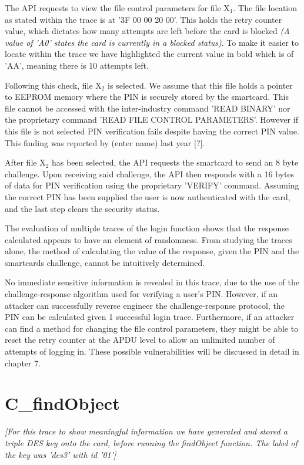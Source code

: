 \documentclass[bsc,frontabs,twoside,singlespacing,parskip,deptreport]{infthesis}     %
\begin{document}
The API requests to view the file control parameters for file X$_1$. The file location as stated within the trace is at '3F 00 00  20 00'. This holds the retry counter value, which dictates how many attempts are left before the card is blocked \textit{(A value of 'A0' states the card is currently in a blocked status)}. To make it easier to locate within the trace we have highlighted the current value in bold which is of 'AA', meaning there is 10 attempts left.

Following this check, file X$_2$ is selected. We assume that this file holds a pointer to EEPROM memory where the PIN is securely stored by the smartcard. This file cannot be accessed with the inter-industry command 'READ BINARY' nor the proprietary command 'READ FILE CONTROL PARAMETERS'. However if this file is not selected PIN verification fails despite having the correct PIN value. This finding was reported by (enter name) last year [?].

After file X$_2$ has been selected, the API requests the smartcard to send an 8 byte challenge. Upon receiving said challenge, the API then responds with a 16 bytes of data for PIN verification using the proprietary 'VERIFY' command. Assuming the correct PIN has been supplied the user is now authenticated with the card, and the last step clears the security status.

The evaluation of multiple traces of the login function shows that the response calculated appears to have an element of randomness. From studying the traces alone, the method of calculating the value of the response, given the PIN and the smartcards challenge, cannot be intuitively determined.

No immediate sensitive information is revealed in this trace, due to the use of the challenge-response algorithm used for verifying a user's PIN. However, if an attacker can successfully reverse engineer the challenge-response protocol, the PIN can be calculated given 1 successful login trace. Furthermore, if an attacker can find a method for changing the file control parameters, they might be able to reset the retry counter at the APDU level to allow an unlimited number of attempts of logging in. These possible vulnerabilities will be discussed in detail in chapter 7.

\section{C\_findObject}
\textit{[For this trace to show meaningful information we have generated and stored a triple DES key onto the card, before running the findObject function. The label of the key was 'des3' with id '01']}
\end{document}
